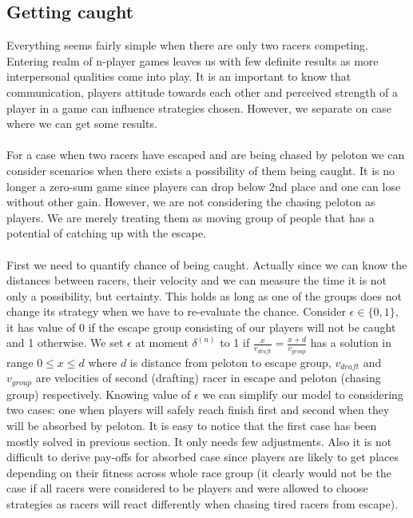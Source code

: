 \documentclass[10pt, a4paper]{report}
\begin{document}
\subsection{Getting caught}
Everything seems fairly simple when there are only two racers competing. Entering realm of n-player games leaves us with few definite results as more interpersonal qualities come into play. It is an important to know that communication, players attitude towards each other and perceived strength of a player in a game can influence strategies chosen. However, we separate on case where we can get some results.
\\\\
For a case when two racers have escaped and are being chased by peloton we can consider scenarios when there exists a possibility of them being caught. It is no longer a zero-sum game since players can drop below 2nd place and one can lose without other gain. However, we are not considering the chasing peloton as players. We are merely treating them as moving group of people that has a potential of catching up with the escape.
\\\\
First we need to quantify chance of being caught. Actually since we can know the distances between racers, their velocity and we can measure the time it is not only a possibility, but certainty. This holds as long as one of the groups does not change its strategy when we have to re-evaluate the chance. Consider $\epsilon \in \{0,1\}$, it has value of 0 if the escape group consisting of our players will not be caught and 1 otherwise. We set $\epsilon$ at moment $\delta^{(n)}$ to 1 if $\frac{x}{v_{draft}}=\frac{x+d}{v_{group}}$ has a solution in range $0\le x\le d$ where $d$ is distance from peloton to escape group, $v_{draft}$ and $v_{group}$ are velocities of second (drafting) racer in escape and peloton (chasing group) respectively. Knowing value of $\epsilon$ we can simplify our model to considering two cases: one when players will safely reach finish first and second when they will be absorbed by peloton. It is easy to notice that the first case has been mostly solved in previous section. It only needs few adjustments. Also it is not difficult to derive pay-offs for absorbed case since players are likely to get places depending on their fitness across whole race group (it clearly would not be the case if all racers were considered to be players and were allowed to choose strategies as racers will react differently when chasing tired racers from escape).
\\\\
\end{document}
